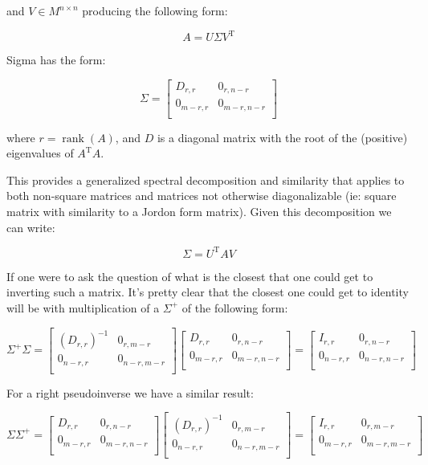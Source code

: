 \documentclass{article}      %
\newcommand{\T}[0]{\text{T}}
\DeclareMathOperator{\rank}{rank}
\begin{document}
and $V \in M^{n \times n} $ producing the following form:

\[
A = U \Sigma V^\T
\]

Sigma has the form:

\[
\Sigma = 
\begin{bmatrix}
D_{r,r} & 0_{r,n-r} \\
0_{m-r,r} & 0_{m-r,n-r} \\
\end{bmatrix}
\]

where $r = \rank(A)$, and $D$ is a diagonal matrix with the root of the (positive) eigenvalues of $A^\T A$.

This provides a generalized spectral decomposition and similarity that applies to both non-square matrices and matrices not otherwise diagonalizable
(ie: square matrix with similarity to a Jordon form matrix).  Given this decomposition we can write:

\[
\Sigma = U^\T A V
\]

If one were to ask the question of what is the closest that one could get to inverting such a matrix.  It's pretty clear that the closest one could get to
identity will be with multiplication of a $\Sigma^{+}$ of the following form:

\[
\Sigma^{+} \Sigma
=
\begin{bmatrix}
(D_{r,r})^{-1} & 0_{r,m-r} \\
0_{n-r,r} & 0_{n-r,m-r} \\
\end{bmatrix}
\begin{bmatrix}
D_{r,r} & 0_{r,n-r} \\
0_{m-r,r} & 0_{m-r,n-r} \\
\end{bmatrix}
=
\begin{bmatrix}
I_{r,r} & 0_{r,n-r} \\
0_{n-r,r} & 0_{n-r,n-r} \\
\end{bmatrix}
\]

For a right pseudoinverse we have a similar result:

\[
\Sigma
\Sigma^{+}
=
\begin{bmatrix}
D_{r,r} & 0_{r,n-r} \\
0_{m-r,r} & 0_{m-r,n-r} \\
\end{bmatrix}
\begin{bmatrix}
(D_{r,r})^{-1} & 0_{r,m-r} \\
0_{n-r,r} & 0_{n-r,m-r} \\
\end{bmatrix}
=
\begin{bmatrix}
I_{r,r} & 0_{r,m-r} \\
0_{m-r,r} & 0_{m-r,m-r} \\
\end{bmatrix}
\]
\end{document}
